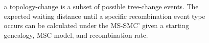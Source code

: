 \documentclass[11pt]{article}
\begin{document}
\begin{figure}[t]
{		a topology-change is a subset of possible tree-change events. The expected waiting
		distance until a specific recombination event type occurs can be calculated under 
		the MS-SMC' given a starting genealogy, MSC model, and recombination rate.
}
\label{fig:fig2}
\end{figure}
\end{document}

